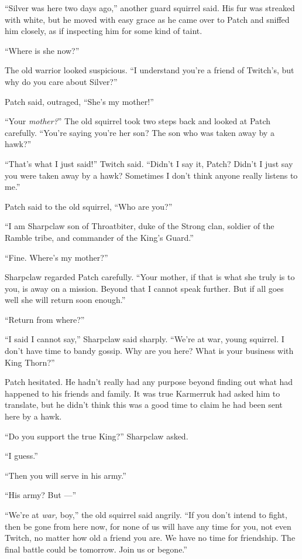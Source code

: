 \documentclass[ebook,oneside,openany,12pt]{memoir}
\begin{document}
“Silver was here two days ago,” another guard squirrel said. His fur
was streaked with white, but he moved with easy grace as he came over
to Patch and sniffed him closely, as if inspecting him for some kind
of taint.

“Where is she now?”

The old warrior looked suspicious. “I understand you’re a friend of
Twitch’s, but why do you care about Silver?”

Patch said, outraged, “She’s my mother!”

“Your \emph{mother?}” The old squirrel took two steps back and
looked at Patch carefully. “You’re saying you’re her son? The son who
was taken away by a hawk?”

“That’s what I just said!” Twitch said. “Didn’t I say it, Patch?
Didn’t I just say you were taken away by a hawk? Sometimes I don’t
think anyone really listens to me.”

Patch said to the old squirrel, “Who are you?”

“I am Sharpclaw son of Throatbiter, duke of the Strong clan, soldier
of the Ramble tribe, and commander of the King’s Guard.”

“Fine. Where’s my mother?”

Sharpclaw regarded Patch carefully. “Your mother, if that is what she
truly is to you, is away on a mission. Beyond that I cannot speak
further. But if all goes well she will return soon enough.”

“Return from where?”

“I said I cannot say,” Sharpclaw said sharply. “We’re at war, young
squirrel. I don’t have time to bandy gossip. Why are you here? What is
your business with King Thorn?”

Patch hesitated. He hadn’t really had any purpose beyond finding out
what had happened to his friends and family. It was true Karmerruk had
asked him to translate, but he didn’t think this was a good time to
claim he had been sent here by a hawk.

“Do you support the true King?” Sharpclaw asked.

“I guess.”

“Then you will serve in his army.”

“His army? But —”

“We’re at \emph{war,} boy,” the old squirrel said angrily. “If you
don’t intend to fight, then be gone from here now, for none of us will
have any time for you, not even Twitch, no matter how old a friend you
are. We have no time for friendship. The final battle could be
tomorrow. Join us or begone.”
\end{document}

